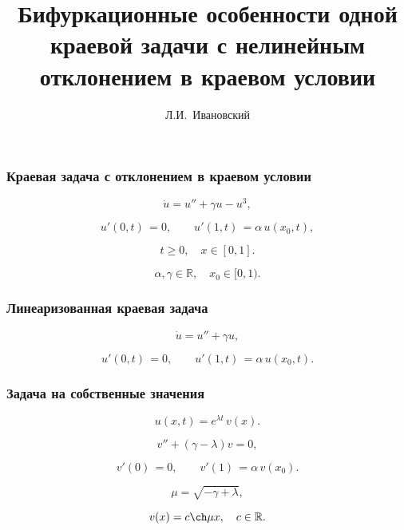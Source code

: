 \documentclass[fullscreen=true, unicode, bookmarks=false]{beamer}
\title[]{ {\huge Бифуркационные особенности одной краевой задачи с нелинейным отклонением в краевом условии } }
\author[]{{\large Л.И.~Ивановский}}
\date{ }
\institute[]
{ ЯрГУ им. П.Г. Демидова }
\begin{document}
\begin{frame}
\titlepage
\end{frame} 

\begin{frame}
\frametitle{ Краевая задача с отклонением в краевом условии }
 
\begin{equation}
	\dot u = u'' + \gamma u - u^3,	
\end{equation}

\begin{equation}
	u'(0, t) \, = 0, \qquad u'(1, t) \, = \alpha\,u(x_0, t),
\end{equation}

\bigskip

$$ t \geqslant 0, \quad x \in [0,1]. $$


$$ \alpha, \gamma \in \mathbb{R}, \quad x_0 \in [0, 1). $$

\end{frame}

\begin{frame}
\frametitle{ Линеаризованная краевая задача }
 
\begin{equation}
	\dot u = u'' + \gamma u,	
\end{equation}

\begin{equation}	
	u'(0, t) \, = 0, \qquad u'(1, t) \, = \alpha\,u(x_0, t).
\end{equation}

\end{frame}

\begin{frame}
\frametitle{ Задача на собственные значения }
 
$$ u(x, t) = e^{\lambda t} \, v(x). $$

\bigskip
 
\begin{equation}
	v'' + (\gamma - \lambda)v = 0,	
\end{equation}

\begin{equation}	
	v'(0) \, = 0, \qquad v'(1) \, = \alpha\,v(x_0).
\end{equation}

\bigskip

$$ \mu = \sqrt{-\gamma + \lambda}, $$

$$ v(x) = c \ch  \mu x, \quad c \in \mathbb{R}. $$

\end{frame}
\end{document}
